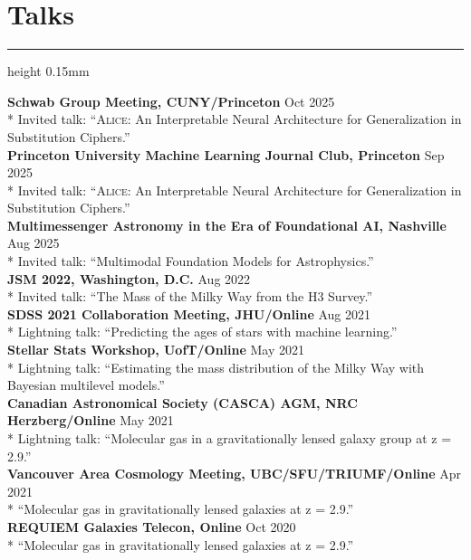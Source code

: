 \documentclass[10pt]{extarticle}
\newcommand{\hrulesp}[1]{%
  \vspace{-3.0mm}
  \hrule height 0.15mm
  \vspace{#1}
}
\begin{document}

\vspace{-7mm}
\section*{Talks}
\hrulesp{2mm}

\textbf{Schwab Group Meeting, CUNY/Princeton} \hfill Oct 2025 \\*
Invited talk: ``\textsc{Alice}: An Interpretable Neural Architecture for Generalization in Substitution Ciphers.'' \\
\textbf{Princeton University Machine Learning Journal Club, Princeton} \hfill Sep 2025 \\*
Invited talk: ``\textsc{Alice}: An Interpretable Neural Architecture for Generalization in Substitution Ciphers.'' \\
\textbf{Multimessenger Astronomy in the Era of Foundational AI, Nashville} \hfill Aug 2025 \\*
Invited talk: ``Multimodal Foundation Models for Astrophysics.'' \\
\textbf{JSM 2022, Washington, D.C.} \hfill Aug 2022 \\*
Invited talk: ``The Mass of the Milky Way from the H3 Survey.'' \\
\textbf{SDSS 2021 Collaboration Meeting, JHU/Online} \hfill Aug 2021 \\*
Lightning talk: ``Predicting the ages of stars with machine learning.'' \\
\textbf{Stellar Stats Workshop, UofT/Online} \hfill May 2021 \\*
Lightning talk: ``Estimating the mass distribution of the Milky Way with Bayesian multilevel models.'' \\
\textbf{Canadian Astronomical Society (CASCA) AGM, NRC Herzberg/Online} \hfill May 2021 \\*
Lightning talk: ``Molecular gas in a gravitationally lensed galaxy group at z = 2.9.'' \\
\textbf{Vancouver Area Cosmology Meeting, UBC/SFU/TRIUMF/Online} \hfill Apr 2021 \\*
``Molecular gas in gravitationally lensed galaxies at z = 2.9.'' \\
\textbf{REQUIEM Galaxies Telecon, Online} \hfill Oct 2020 \\*
``Molecular gas in gravitationally lensed galaxies at z = 2.9.''
\end{document}
